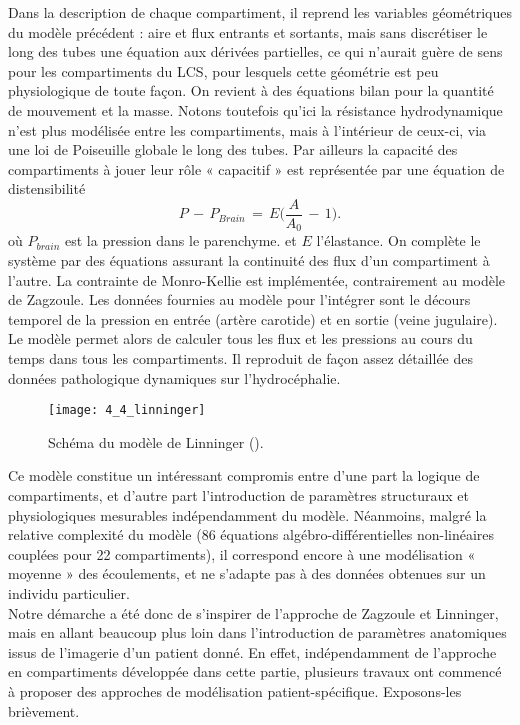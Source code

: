 Dans la description de
chaque compartiment, il reprend les variables géométriques du modèle précédent : aire et flux
entrants et sortants, mais sans discrétiser le long des tubes une équation aux dérivées partielles, ce
qui n'aurait guère de sens pour les compartiments du LCS, pour lesquels cette géométrie est peu
physiologique de toute façon. On revient à des équations bilan pour la quantité de mouvement et la
masse. Notons toutefois qu'ici la résistance hydrodynamique n'est plus modélisée entre les
compartiments, mais à l'intérieur de ceux-ci, via une loi de Poiseuille globale le long des tubes. Par
ailleurs la capacité des compartiments à jouer leur rôle « capacitif » est représentée par une équation
de distensibilité
\begin{equation}
P\,-\,P_{Brain}\,=\,E\biggl(\frac{A}{A_0}\,-\,1\biggr).
\end{equation}
où $P_{brain}$ est la pression dans le parenchyme. et $E$ l'élastance. On complète le système par des équations assurant la continuité des flux d'un compartiment à
l'autre. La contrainte de Monro-Kellie est implémentée, contrairement au modèle de Zagzoule. Les
données fournies au modèle pour l'intégrer sont le décours temporel de la pression en entrée (artère
carotide) et en sortie (veine jugulaire). Le modèle permet alors de calculer tous les flux et les pressions
au cours du temps dans tous les compartiments. Il reproduit de façon assez détaillée des données
pathologique dynamiques sur l'hydrocéphalie.\\
\begin{figure}[!t]
\centering
\texttt{[image: 4\_4\_linninger]}
\caption{Schéma du modèle de Linninger (\cite{Linninger2009}).}
\label{fig:4_4_linninger}	
\end{figure}
Ce modèle constitue un intéressant compromis entre d'une part la logique de compartiments,
et d'autre part l'introduction de paramètres structuraux et physiologiques mesurables
indépendamment du modèle. Néanmoins, malgré la relative complexité du modèle (86 équations
algébro-différentielles non-linéaires couplées pour 22 compartiments), il correspond encore à une
modélisation « moyenne » des écoulements, et ne s'adapte pas à des données obtenues sur un
individu particulier.\\
Notre démarche a été donc de s'inspirer de l'approche de Zagzoule et Linninger, mais en allant
beaucoup plus loin dans l'introduction de paramètres anatomiques issus de l'imagerie d'un patient
donné. En effet, indépendamment de l'approche en compartiments développée dans cette partie,
plusieurs travaux ont commencé à proposer des approches de modélisation patient-spécifique.
Exposons-les brièvement.

